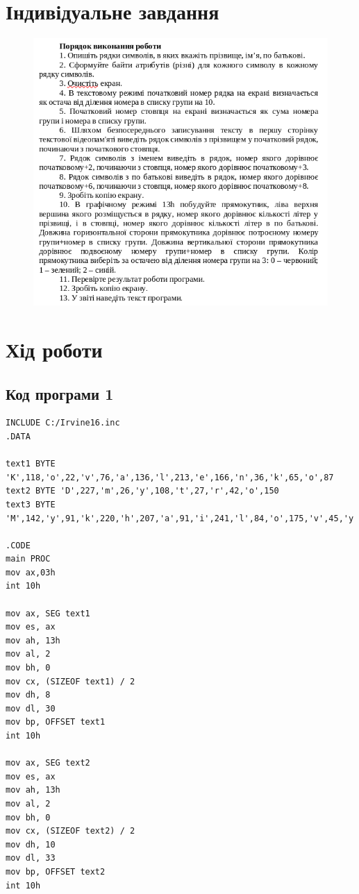 \documentclass{article}
\begin{document}
\begin{normalsize}
		\section*{Індивідуальне завдання}
		\begin{figure}[H]
			\centering
			\includegraphics[scale=0.7]{v}
		\end{figure}
		
		\section*{Хід роботи}
		\subsection*{Код програми 1}
		\begin{lstlisting}[language={[x86masm]Assembler}]
INCLUDE C:/Irvine16.inc
.DATA

text1 BYTE 'K',118,'o',22,'v',76,'a',136,'l',213,'e',166,'n',36,'k',65,'o',87
text2 BYTE 'D',227,'m',26,'y',108,'t',27,'r',42,'o',150
text3 BYTE 'M',142,'y',91,'k',220,'h',207,'a',91,'i',241,'l',84,'o',175,'v',45,'y',248,'c',100,'h',35

.CODE
main PROC
mov ax,03h
int 10h

mov ax, SEG text1
mov es, ax
mov ah, 13h
mov al, 2
mov bh, 0
mov cx, (SIZEOF text1) / 2
mov dh, 8
mov dl, 30
mov bp, OFFSET text1
int 10h

mov ax, SEG text2
mov es, ax
mov ah, 13h
mov al, 2
mov bh, 0
mov cx, (SIZEOF text2) / 2
mov dh, 10
mov dl, 33
mov bp, OFFSET text2
int 10h


\end{lstlisting}
\end{normalsize}
\end{document}
